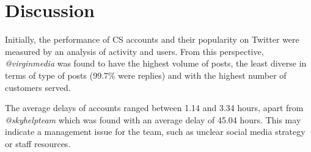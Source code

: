 \documentclass[sigconf]{acmart}
\begin{document}





\section{Discussion}\label{discussion}

Initially, the performance of CS accounts and their popularity on
Twitter were measured by an analysis of activity and users. From this
perspective, {\emph{@virginmedia}} was found to have the highest
volume of posts, the least diverse in terms of type of posts (99.7\%
were replies) and with the highest number of customers served.

The average delays of accounts ranged between 1.14 and
3.34 hours, apart from {\emph{@skyhelpteam}} which was found with an average
delay of 45.04 hours. This may indicate a management issue for the
team, such as unclear social media strategy or staff resources. 
\end{document}
